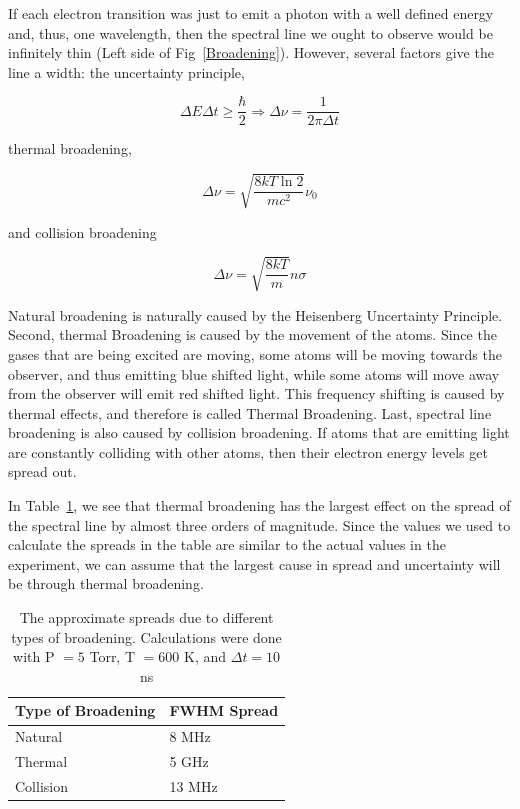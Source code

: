If each electron transition was just to emit a photon with a well defined energy and, thus, one wavelength, then the spectral line we ought to observe would be infinitely thin (Left side of Fig~\ref{Broadening}). However, several factors give the line a width: the uncertainty principle,

\begin{equation}
   \Delta{E}\Delta{t} \geq \frac{\hbar}{2} \Rightarrow \Delta \nu = \frac{1}{2 \pi \Delta t}
  \label{Natural Equation}
\end{equation}

thermal broadening,

\begin{equation}
  \Delta \nu = \sqrt{\frac{8kT\ln 2}{mc^2}}\nu_{0}
  \label{Doppler Equation}
\end{equation}

and collision broadening

\begin{equation}
  \Delta \nu = \sqrt{\frac{8kT}{m}} n \sigma
  \label{Collision Equation}
\end{equation}  

Natural broadening is naturally caused by the Heisenberg Uncertainty Principle. Second, thermal Broadening is caused by the movement of the atoms. Since the gases that are being excited are moving, some atoms will be moving towards the observer, and thus emitting blue shifted light, while some atoms will move away from the observer will emit red shifted light. This frequency shifting is caused by thermal effects, and therefore is called Thermal Broadening. Last, spectral line broadening is also caused by collision broadening. If atoms that are emitting light are constantly colliding with other atoms, then their electron energy levels get spread out.

In Table~\ref{Spread}, we see that thermal broadening has the largest effect on the spread of the spectral line by almost three orders of magnitude. Since the values we used to calculate the spreads in the table are similar to the actual values in the experiment, we can assume that the largest cause in spread and uncertainty will be through thermal broadening. 

\begin{table}[h]
  \begin{tabular}{|l|l|}
  \hline
  Type of Broadening & FWHM Spread                         \\ \hline
  Natural            & 8 MHz                               \\
  Thermal            & 5 GHz                               \\
  Collision          & 13 MHz                              \\ \hline
  \end{tabular}
  \caption{The approximate spreads due to different types of broadening. Calculations were done with P $= 5$ Torr, T $= 600$ K, and $\Delta t = 10$ ns}
  \label{Spread}
\end{table}

